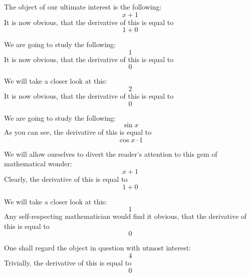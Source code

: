 \documentclass{article}
\begin{document}
The object of our ultimate interest is the following:
\begin{equation}
x + 1 
\end{equation}
It is now obvious, that the derivative of this is equal to
\begin{equation}
1 + 0 
\end{equation}

We are going to study the following:
\begin{equation}
1 
\end{equation}
It is now obvious, that the derivative of this is equal to
\begin{equation}
0 
\end{equation}

We will take a closer look at this:
\begin{equation}
2 
\end{equation}
It is now obvious, that the derivative of this is equal to
\begin{equation}
0 
\end{equation}

We are going to study the following:
\begin{equation}
\sin x 
\end{equation}
As you can see, the derivative of this is equal to
\begin{equation}
\cos x \cdot 1 
\end{equation}

We will allow ourselves to divert the reader's attention to this gem of mathematical wonder:
\begin{equation}
x + 1 
\end{equation}
Clearly, the derivative of this is equal to
\begin{equation}
1 + 0 
\end{equation}

We will take a closer look at this:
\begin{equation}
1 
\end{equation}
Any self-respecting mathematician would find it obvious, that the derivative of this is equal to
\begin{equation}
0 
\end{equation}

One shall regard the object in question with utmost interest:
\begin{equation}
4 
\end{equation}
Trivially, the derivative of this is equal to
\begin{equation}
0 
\end{equation}
\end{document}
